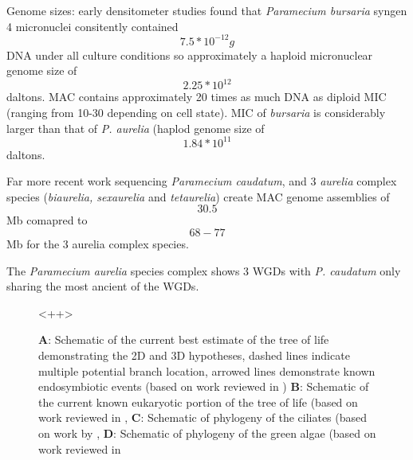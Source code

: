 



Genome sizes: early densitometer studies found that \textit{Paramecium bursaria} syngen 4 
micronuclei consitently contained \[ 7.5*10^{-12}g \] DNA under all culture conditions so 
approximately a haploid micronuclear genome size of \[ 2.25*10^{12}\] daltons.
MAC contains approximately 20 times as much DNA as diploid MIC (ranging from 10-30
depending on cell state).
MIC of \textit{bursaria} is considerably larger than that of \textit{P. aurelia}
(haplod genome size of \[ 1.84*10^{11} \] daltons.
\citep{Cullis1972}

Far more recent work sequencing \textit{Paramecium caudatum}, 
and 3 \textit{aurelia} complex species (\textit{biaurelia, sexaurelia} and \textit{tetaurelia})
create MAC genome assemblies of \[30.5\] Mb comapred to \[68-77\] Mb for the 3 aurelia complex species.
\citep{McGrath2014}


The \textit{Paramecium aurelia} species complex shows 3 WGDs with \textit{P. caudatum}
only sharing the most ancient of the WGDs.

\citep{McGrath2014}




\begin{figure}
    \caption{\textbf{A}: Schematic of the current best estimate of the tree of life demonstrating the 2D and 3D hypotheses,
dashed lines indicate multiple potential branch location, arrowed lines demonstrate known endosymbiotic events (based on work reviewed in \citep{Gribaldo2010})
\textbf{B}: Schematic of the current known eukaryotic portion of the tree of life (based on work reviewed in \citep{Burki2014,Adl2013},
\textbf{C}: Schematic of phylogeny of the ciliates (based on work by \citep{Bachvaroff2011,},
\textbf{D}: Schematic of phylogeny of the green algae (based on work reviewed in \citep{Leliaert2012,}}
    <++>
\end{figure}

